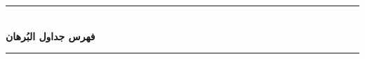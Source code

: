 \documentclass[10pt, openany, oneside]{book}
\renewcommand{\normalsize}{\fontsize{10}{13}\selectfont}
\begin{document}
\vspace{2em}


\vspace{1.5em}


\begin{center}
    \rule{0.3\textwidth}{0.4pt}\\[0.5em]
    {\normalsize\bfseries فهرس جداول البُرهان}\\[0.3em]
    \rule{0.3\textwidth}{0.4pt}
\end{center}

\vspace{1em}
\end{document}
